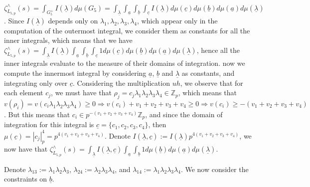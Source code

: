\documentclass{article}
\begin{document}
$\zeta_{L_{5,p}}^{\wedge}(s)=\displaystyle\int_{{G_{5}^{+}}}{I(\underline{\lambda})}d\mu(G_{5})=\displaystyle\int_{\underline\lambda}\int_{\underline{a}}\int_{\underline{b}}\int_{\underline{c}}{I(\underline{\lambda})}d\mu(\underline{c})d\mu(\underline{b})d\mu(\underline{a})d\mu(\underline{\lambda})$. Since $I(\underline{\lambda})$ depends only on $\lambda_{1},\lambda_{2},\lambda_{3},\lambda_{4}$, which appear only in the computation of the outermost integral, we consider them as constants for all the inner integrals, which means that  we have $\zeta_{L_{5,p}}^{\wedge}(s)=\displaystyle\int_{\underline\lambda}I(\underline{\lambda})\int_{\underline{a}}\int_{\underline{b}}\int_{\underline{c}}1d\mu(\underline{c})d\mu(\underline{b})d\mu(\underline{a})d\mu(\underline{\lambda})$, hence all the inner integrals evaluate to the measure of their domains of integration.
now we compute the innermost integral by considering $\underline{a}$, $\underline{b}$ and $\underline{\lambda}$ as constants, and integrating only over $\underline{c}$. Considering the multiplication $uh$, we observe that for each element $c_{j}$, we must have that $\rho_{j}=c_{j}\lambda_{1}\lambda_{2}\lambda_{3}\lambda_{4}\in\mathbb{Z}_{p}$, which means that $v(\rho_{i})=v(c_{i}\lambda_{1}\lambda_{2}\lambda_{3}\lambda_{4})\geq{0}\Rightarrow{v(c_{i})+v_{1}+v_{2}+v_{3}+v_{4}}\geq{0}\Rightarrow{v(c_{i})\geq{-(v_{1}+v_{2}+v_{3}+v_{4})}}$. But this means that $c_{i}\in{p^{-(v_{1}+v_{2}+v_{3}+v_{4})}\mathbb{Z}_{p}}$, and since the domain of integration for this integral is $\underline{c}=\{c_{1},c_{2},c_{3},c_{4}\}$, then $\mu(\underline{c})=|c_{j}|_{p}^{4}=p^{4(v_{1}+v_{2}+v_{3}+v_{4})}$. Denote $I(\underline{\lambda},\underline{c}):=I(\underline{\lambda})p^{4(v_{1}+v_{2}+v_{3}+v_{4})}$, we now have that $\zeta_{L_{5,p}}^{\wedge}(s)=\displaystyle\int_{\underline\lambda}I(\underline{\lambda},\underline{c})\int_{\underline{a}}\int_{\underline{b}}1d\mu(\underline{b})d\mu(\underline{a})d\mu(\underline{\lambda})$.

Denote $\lambda_{13}:=\lambda_{1}\lambda_{2}\lambda_{3}$, $\lambda_{24}:=\lambda_{2}\lambda_{3}\lambda_{4}$, and $\lambda_{14}:=\lambda_{1}\lambda_{2}\lambda_{3}\lambda_{4}$. We now consider the constraints on $\underline{b}$. 
\end{document}
